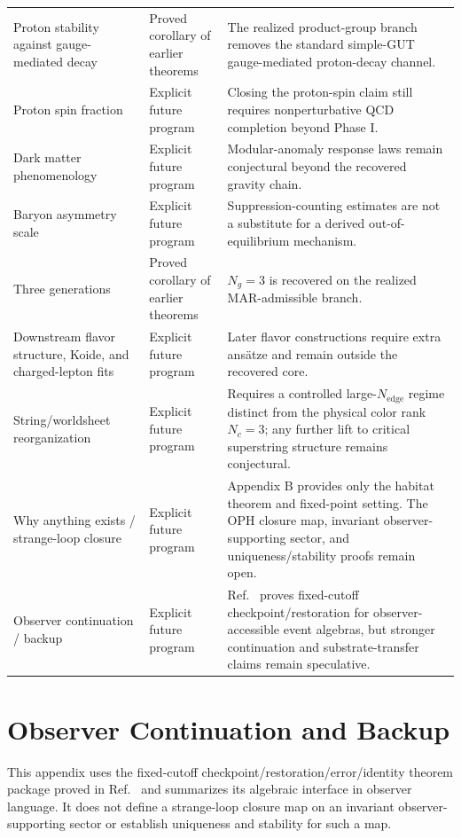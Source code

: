 \begin{longtable}{p{} p{} p{}}
Proton stability against gauge-mediated decay & Proved corollary of earlier theorems & The realized product-group branch removes the standard simple-GUT gauge-mediated proton-decay channel. \\
Proton spin fraction & Explicit future program & Closing the proton-spin claim still requires nonperturbative QCD completion beyond Phase I. \\
Dark matter phenomenology & Explicit future program & Modular-anomaly response laws remain conjectural beyond the recovered gravity chain. \\
Baryon asymmetry scale & Explicit future program & Suppression-counting estimates are not a substitute for a derived out-of-equilibrium mechanism. \\
Three generations & Proved corollary of earlier theorems & \(N_g=3\) is recovered on the realized MAR-admissible branch. \\
Downstream flavor structure, Koide, and charged-lepton fits & Explicit future program & Later flavor constructions require extra ans\"atze and remain outside the recovered core. \\
String/worldsheet reorganization & Explicit future program & Requires a controlled large-\(N_{\mathrm{edge}}\) regime distinct from the physical color rank \(N_c=3\); any further lift to critical superstring structure remains conjectural. \\
Why anything exists / strange-loop closure & Explicit future program & Appendix B provides only the habitat theorem and fixed-point setting. The OPH closure map, invariant observer-supporting sector, and uniqueness/stability proofs remain open. \\
Observer continuation / backup & Explicit future program & Ref.~\cite{ophmicrophysics} proves fixed-cutoff checkpoint/restoration for observer-accessible event algebras, but stronger continuation and substrate-transfer claims remain speculative. \\
\end{longtable}

\section{Observer Continuation and Backup}

This appendix uses the fixed-cutoff checkpoint/restoration/error/identity theorem package proved
in Ref.~\cite{ophmicrophysics} and summarizes its algebraic interface in observer language. It
does not define a strange-loop closure map on an invariant observer-supporting sector or establish
uniqueness and stability for such a map.

